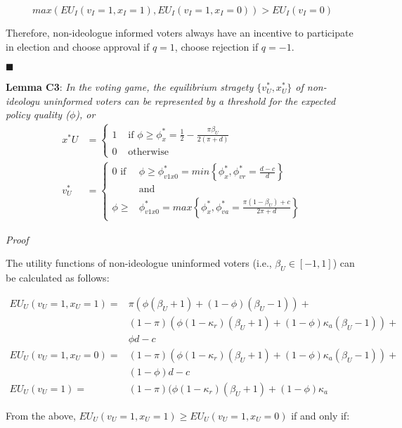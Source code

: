$$max(EU_I (v_I=1,x_I=1), EU_I (v_I=1,x_I=0)) > EU_I (v_I=0)$$

\par Therefore, non-ideologue informed voters always have an incentive to participate in election and choose approval if $q=1$, choose rejection if $q=-1$.

\hfill $\blacksquare$

\noindent \textbf{Lemma C3}: \textit{In the voting game, the equilibrium stragety $\{v^*_U, x^*_U\}$  of non-ideologu uninformed voters can be represented by a threshold for the expected policy quality ($\phi$), or}\\

\begin{align*}
	x^*U &= \begin{cases}
		1 &\text{ if } \phi \geq \phi^*_x = \frac{1}{2} - \frac{\pi \beta_U}{2(\pi+d)}\\
		0 &\text{ otherwise}
	\end{cases}\\
	v^*_U &= \begin{cases}
		0 \text{ if } &\phi \geq \phi^*_{v1x0} = min\left\{ \phi^*_x, \phi^*_{vr} = \frac{d-c}{d} \right\}\\
		&\text{and }\\
		\phi \geq &\phi^*_{v1x0} = max\left\{ \phi^*_x, \phi^*_{va} = \frac{\pi(1-\beta_U) + c}{2\pi + d} \right\}
	\end{cases}
\end{align*}

\noindent \textit{Proof}

\par The utility functions of non-ideologue uninformed voters (i.e., $\beta_U \in [-1,1]$) can be calculated as follows:

\begin{align*}
	EU_U (v_U=1,x_U=1) = &\pi ( \phi(\beta_U+1) + (1-\phi)(\beta_U-1)) + \\
	&(1-\pi)(\phi(1-\kappa_r)(\beta_U+1) + (1-\phi)\kappa_a(\beta_U-1) ) + \\
	&\phi d-c \\
	EU_U (v_U=1,x_U=0) = &(1-\pi) (\phi(1-\kappa_r)(\beta_U+1) + (1-\phi)\kappa_a(\beta_U-1) ) + \\
	&(1-\phi) d-c \\
	EU_U (v_U=1) = &(1-\pi) (\phi(1-\kappa_r)(\beta_U+1) + (1-\phi)\kappa_a
\end{align*}

\noindent From the above, $EU_U (v_U=1,x_U=1) \geq EU_U (v_U=1,x_U=0)$ if and only if:

